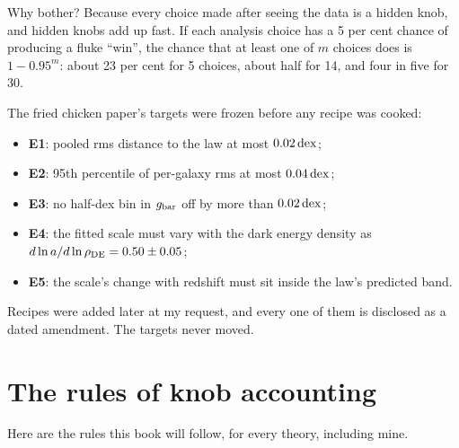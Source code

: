 Why bother? Because every choice made after seeing the data is a hidden knob, and hidden knobs add up fast. If each analysis choice has a 5 per cent chance of producing a fluke ``win'', the chance that at least one of $m$ choices does is $1-0.95^m$: about 23 per cent for 5 choices, about half for 14, and four in five for 30.








The fried chicken paper's targets were frozen before any recipe was cooked:
\begin{itemize}
\item \textbf{E1}: pooled rms distance to the law at most $0.02\,\mathrm{dex}$;
\item \textbf{E2}: 95th percentile of per-galaxy rms at most $0.04\,\mathrm{dex}$;
\item \textbf{E3}: no half-dex bin in $g_{\rm bar}$ off by more than $0.02\,\mathrm{dex}$;
\item \textbf{E4}: the fitted scale must vary with the dark energy density as $d\ln a/d\ln\rho_{\rm DE}=0.50\pm0.05$;
\item \textbf{E5}: the scale's change with redshift must sit inside the law's predicted band.
\end{itemize}
Recipes were added later at my request, and every one of them is disclosed as a dated amendment. The targets never moved.

\section{The rules of knob accounting}

Here are the rules this book will follow, for every theory, including mine.

